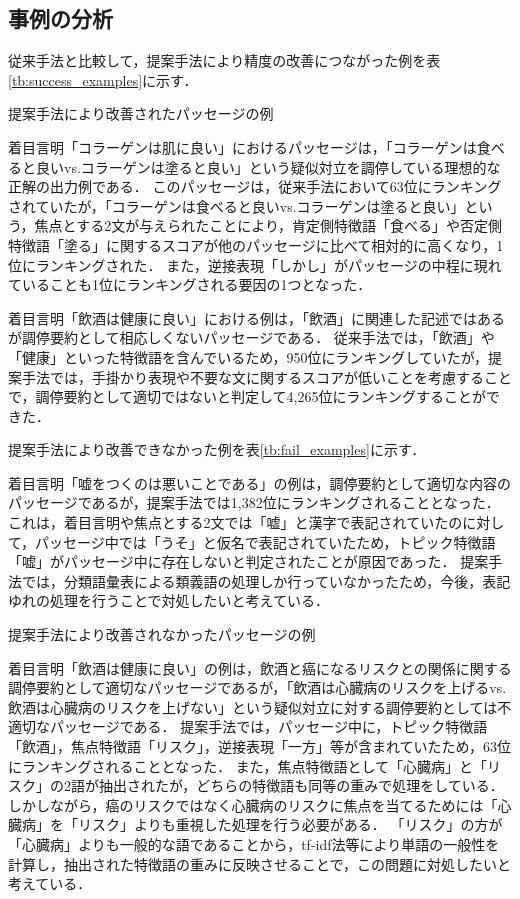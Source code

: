 \documentclass[japanese]{jnlp_1.4}
\begin{document}
\subsection{事例の分析}

従来手法と比較して，提案手法により精度の改善につながった例を表\ref{tb:success_examples}に示す．

\begin{table}[t]
 \caption{提案手法により改善されたパッセージの例}
 \label{tb:success_examples}

\end{table}

着目言明「コラーゲンは肌に良い」におけるパッセージは，「コラーゲンは食べると良いvs.コラーゲンは塗ると良い」という疑似対立を調停している理想的な正解の出力例である．
このパッセージは，従来手法において63位にランキングされていたが，「コラーゲンは食べると良いvs.コラーゲンは塗ると良い」という，焦点とする2文が与えられたことにより，肯定側特徴語「食べる」や否定側特徴語「塗る」に関するスコアが他のパッセージに比べて相対的に高くなり，1位にランキングされた．
また，逆接表現「しかし」がパッセージの中程に現れていることも1位にランキングされる要因の1つとなった．

着目言明「飲酒は健康に良い」における例は，「飲酒」に関連した記述ではあるが調停要約として相応しくないパッセージである．
従来手法では，「飲酒」や「健康」といった特徴語を含んでいるため，950位にランキングしていたが，提案手法では，手掛かり表現や不要な文に関するスコアが低いことを考慮することで，調停要約として適切ではないと判定して4,265位にランキングすることができた．

提案手法により改善できなかった例を表\ref{tb:fail_examples}に示す．

着目言明「嘘をつくのは悪いことである」の例は，調停要約として適切な内容のパッセージであるが，提案手法では1,382位にランキングされることとなった．
これは，着目言明や焦点とする2文では「嘘」と漢字で表記されていたのに対して，パッセージ中では「うそ」と仮名で表記されていたため，トピック特徴語「嘘」がパッセージ中に存在しないと判定されたことが原因であった．
提案手法では，分類語彙表による類義語の処理しか行っていなかったため，今後，表記ゆれの処理を行うことで対処したいと考えている．

\begin{table}[t]
 \caption{提案手法により改善されなかったパッセージの例}
 \label{tb:fail_examples}

\end{table}

着目言明「飲酒は健康に良い」の例は，飲酒と癌になるリスクとの関係に関する調停要約として適切なパッセージであるが，「飲酒は心臓病のリスクを上げるvs.飲酒は心臓病のリスクを上げない」という疑似対立に対する調停要約としては不適切なパッセージである．
提案手法では，パッセージ中に，トピック特徴語「飲酒」，焦点特徴語「リスク」，逆接表現「一方」等が含まれていたため，63位にランキングされることとなった．
また，焦点特徴語として「心臓病」と「リスク」の2語が抽出されたが，どちらの特徴語も同等の重みで処理をしている．
しかしながら，癌のリスクではなく心臓病のリスクに焦点を当てるためには「心臓病」を「リスク」よりも重視した処理を行う必要がある．
「リスク」の方が「心臓病」よりも一般的な語であることから，tf-idf法\cite{dictionary2010}等により単語の一般性を計算し，抽出された特徴語の重みに反映させることで，この問題に対処したいと考えている．
\end{document}
